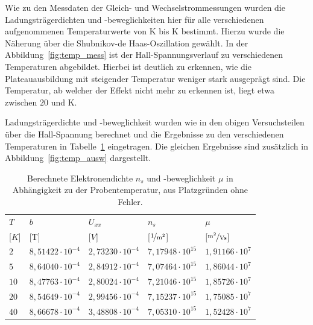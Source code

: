 

Wie zu den Messdaten der Gleich- und Wechselstrommessungen wurden die Ladungsträgerdichten und -beweglichkeiten hier für alle verschiedenen aufgenommenen Temperaturwerte von \unit[2]{K} bis \unit[40]{K} bestimmt. Hierzu wurde die Näherung über die Shubnikov-de Haas-Oszillation gewählt. %
In der Abbildung~\ref{fig:temp_mess} ist der Hall-Spannungsverlauf zu verschiedenen Temperaturen abgebildet. Hierbei ist deutlich zu erkennen, wie die Plateauausbildung mit steigender Temperatur weniger stark ausgeprägt sind. Die Temperatur, ab welcher der Effekt nicht mehr zu erkennen ist, liegt etwa zwischen $20$ und \unit[40]{K}.

Ladungsträgerdichte und -beweglichkeit wurden wie in den obigen Versuchsteilen über die Hall-Spannung berechnet und die Ergebnisse zu den verschiedenen Temperaturen in Tabelle~\ref{tab:temp_ausw} eingetragen. Die gleichen Ergebnisse sind zusätzlich in Abbildung~\ref{fig:temp_ausw} dargestellt.

\begin{table}[h]
	\centering
	\begin{tabular}{|l|r|l|r|r|}
		\hline
		\multicolumn{1}{|l|}{\cellcolor{black!30} $T$ } & \multicolumn{1}{|l|}{\cellcolor{black!30} $b$ } & \multicolumn{1}{|l|}{\cellcolor{black!30} $U_{xx}$ } & \multicolumn{1}{|l|}{\cellcolor{black!30} $n_s$ } & \multicolumn{1}{|l|}{\cellcolor{black!30} $\mu$ } \\
		\multicolumn{1}{|l|}{\cellcolor{black!30} [$\unit{K}$] } &  \multicolumn{1}{|l|}{\cellcolor{black!30} [\unit{T}] } &
		\multicolumn{1}{|l|}{\cellcolor{black!30} [$\unit{V}$] } &  \multicolumn{1}{|l|}{\cellcolor{black!30} [$\unitfrac{1}{m^2}$] } & \multicolumn{1}{|l|}{\cellcolor{black!30} [$\unitfrac{m^2}{Vs}$] } \\ \hline
		$ 2 $  & $ 8,51422\cdot 10^{-4} $  & $ 2,73230\cdot 10^{-4} $  & $ 7,17948\cdot 10^{15} $  & $ 1,91166\cdot 10^{7} $  \\ 
		$ 5 $  & $ 8,64040\cdot 10^{-4} $  & $ 2,84912\cdot 10^{-4} $  & $ 7,07464\cdot 10^{15} $  & $ 1,86044\cdot 10^{7} $  \\ 
		$ 10 $  & $ 8,47763\cdot 10^{-4} $  & $ 2,80024\cdot 10^{-4} $  & $ 7,21046\cdot 10^{15} $  & $ 1,85726\cdot 10^{7} $  \\ 
		$ 20 $  & $ 8,54649\cdot 10^{-4} $  & $ 2,99456\cdot 10^{-4} $  & $ 7,15237\cdot 10^{15} $  & $ 1,75085\cdot 10^{7} $  \\ 
		$ 40 $  & $ 8,66678\cdot 10^{-4} $  & $ 3,48808\cdot 10^{-4} $  & $ 7,05310\cdot 10^{15} $  & $ 1,52428\cdot 10^{7} $  \\ \hline
	\end{tabular}
	\caption{Berechnete Elektronendichte $n_s$ und -beweglichkeit $\mu$ in Abhängigkeit zu der Probentemperatur, aus Platzgründen ohne Fehler.}
	\label{tab:temp_ausw}
\end{table}

